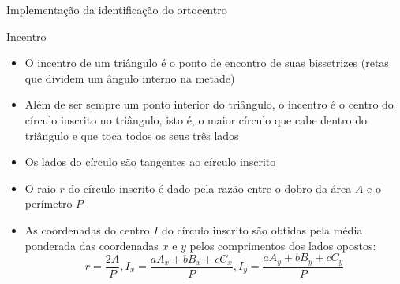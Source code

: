 \begin{frame}[fragile]{Implementação da identificação do ortocentro}
\end{frame}

\begin{frame}[fragile]{Incentro}

    \begin{itemize}
        \item O incentro de um triângulo é o ponto de encontro de suas bissetrizes (retas que dividem um ângulo interno na metade)
        \pause

        \item Além de ser sempre um ponto interior do triângulo, o incentro é o centro do círculo inscrito no triângulo, isto é, o maior círculo que cabe dentro do triângulo e que toca todos os seus três lados 
        \pause

        \item Os lados do círculo são tangentes ao círculo inscrito
        \pause

        \item O raio $r$ do círculo inscrito é dado pela razão entre o dobro da área $A$ e o 
            perímetro $P$
        \pause

        \item As coordenadas do centro $I$ do círculo inscrito são obtidas pela média ponderada 
            das coordenadas $x$ e $y$ pelos comprimentos dos lados opostos:
        \[
            r = \frac{2A}{P}, I_x = \frac{aA_x + bB_x + cC_x}{P}, I_y = \frac{aA_y + bB_y + cC_y}{P}
        \]
    \end{itemize}

\end{frame}

